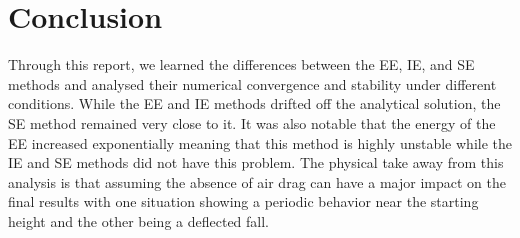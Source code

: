 \section{Conclusion}

Through this report, we learned the differences between the EE, IE, and SE methods and analysed their numerical convergence and stability under different conditions. While the EE and IE methods drifted off the analytical solution, the SE method remained very close to it. It was also notable that the energy of the EE increased exponentially meaning that this method is highly unstable while the IE and SE methods did not have this problem. The physical take away from this analysis is that assuming the absence of air drag can have a major impact on the final results with one situation showing a periodic behavior near the starting height and the other being a deflected fall. 
